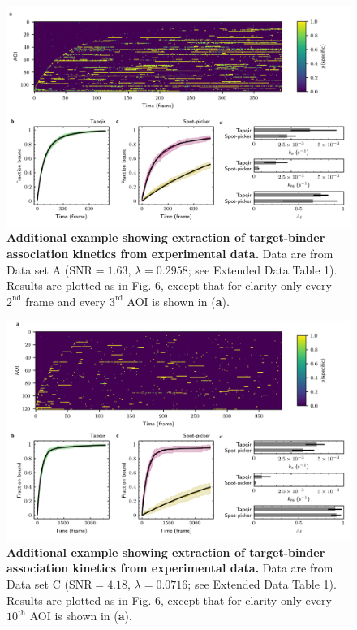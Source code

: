 \begin{figure}[t]
\centering
\includegraphics[width=\textwidth]{extended-data/figure4.png}
\caption{\textbf{Additional example showing extraction of target-binder association kinetics from experimental data.} Data are from Data set A ($\mathrm{SNR} = 1.63$, $\lambda = 0.2958$; see Extended Data Table 1).  Results are plotted as in Fig. 6, except that for clarity only every $2^\mathrm{nd}$ frame and every $3^\mathrm{rd}$ AOI is shown in (\textbf{a}).}
\label{fig:rpb1snap549}
\end{figure}
\pagebreak

\begin{figure}[t]
\centering
\includegraphics[width=\textwidth]{extended-data/figure5.png}
\caption{\textbf{Additional example showing extraction of target-binder association kinetics from experimental data.} Data are from Data set C ($\textrm{SNR} = 4.18$, $\lambda = 0.0716$; see Extended Data Table 1).  Results are plotted as in Fig. 6, except that for clarity only every $10^\mathrm{th}$ AOI is shown in (\textbf{a}).}
\label{fig:sigma54_298P2993}
\end{figure}
\clearpage
\pagebreak


